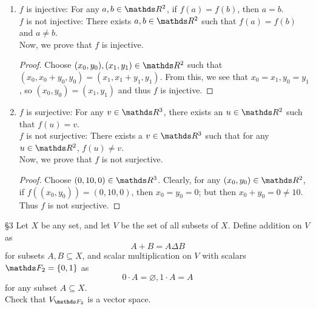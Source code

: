 \documentclass{homework}
\begin{document}
\begin{solution}
  \begin{enumerate}[label=(\alph*)]
    \item $f$ is injective: For any $a,b\in \R^2$, if $f(a)=f(b)$, then $a=b$.\\
      $f$ is not injective: There exists $a,b\in \R^2$ such that $f(a)=f(b)$ and $a\neq b$.\\
      Now, we prove that $f$ is injective.
      \begin{proof}[Proof]
        Choose $(x_0,y_0),(x_1,y_1)\in \R^2$ such that $(x_0,x_0+y_0,y_0)=(x_1,x_1+y_1,y_1)$. From
        this, we see that $ x_0=x_1, y_0=y_1$, so $(x_0,y_0)=(x_1,y_1)$ and thus $f$ is injective.
      \end{proof}

      \item $f$ is surjective: For any $v\in \R^3$, there exists an $u\in \R^2$ such that
        $f(u)=v$.\\
        $f$ is not surjective: There exists a $v\in \R^3$ such that for any $u\in \R^2$, $f(u)\neq
        v$.\\
        Now, we prove that $f$ is not surjective.
        \begin{proof}[Proof]
          Choose $(0,10,0)\in \R^3$. Clearly, for any $(x_0,y_0)\in \R^2$, if
          $f((x_0,y_0))=(0,10,0)$, then $ x_0=y_0=0$; but then $ x_0+y_0=0\neq 10$. Thus $f$ is not
          surjective.
      \end{proof}
  \end{enumerate}
\end{solution}


\begin{problem}{\S 3}
  Let $X$ be any set, and let $V$ be the set of all subsets of $X$. Define addition on $V$ as \[
  A+B=A\Delta B
\] for subsets $A,B\subseteq X$, and scalar multiplication on $V$ with scalars $ \F_2=\{ 0,1 \}$ as
\[
  0\cdot A=\varnothing, 1\cdot A=A
\] for any subset $A\subseteq X$.\\
Check that $V_{\F_2}$ is a vector space.
\end{problem}
\end{document}
